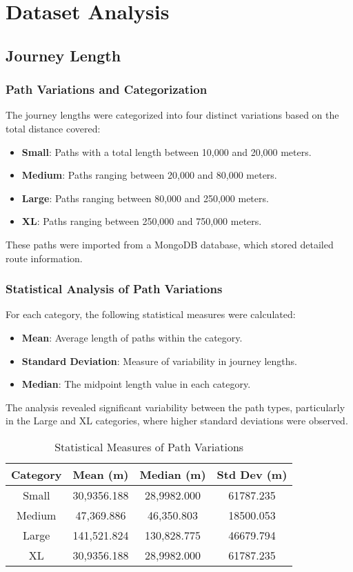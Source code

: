 \section{Dataset Analysis}

\subsection{Journey Length}
\subsubsection{Path Variations and Categorization}
The journey lengths were categorized into four distinct variations based on the total distance covered:
\begin{itemize}
    \item \textbf{Small}: Paths with a total length between 10,000 and 20,000 meters.
    \item \textbf{Medium}: Paths ranging between 20,000 and 80,000 meters.
    \item \textbf{Large}: Paths ranging between 80,000 and 250,000 meters.
    \item \textbf{XL}: Paths ranging between 250,000 and 750,000 meters.
\end{itemize}
These paths were imported from a MongoDB database, which stored detailed route information.

\subsubsection{Statistical Analysis of Path Variations}
For each category, the following statistical measures were calculated:
\begin{itemize}
    \item \textbf{Mean}: Average length of paths within the category.
    \item \textbf{Standard Deviation}: Measure of variability in journey lengths.
    \item \textbf{Median}: The midpoint length value in each category.
\end{itemize}
The analysis revealed significant variability between the path types, particularly in the Large and XL categories, where higher standard deviations were observed.

\begin{table}[h!]
\centering
\begin{tabular}{|c|c|c|c|}
\hline
\textbf{Category} & \textbf{Mean (m)} & \textbf{Median (m)} & \textbf{Std Dev (m)} \\
\hline
Small & 30,9356.188 & 28,9982.000 & 61787.235 \\
Medium & 47,369.886 & 46,350.803 & 18500.053 \\
Large & 141,521.824 & 130,828.775 & 46679.794 \\
XL & 30,9356.188 & 28,9982.000 & 61787.235 \\
\hline
\end{tabular}
\caption{Statistical Measures of Path Variations}
\end{table}

